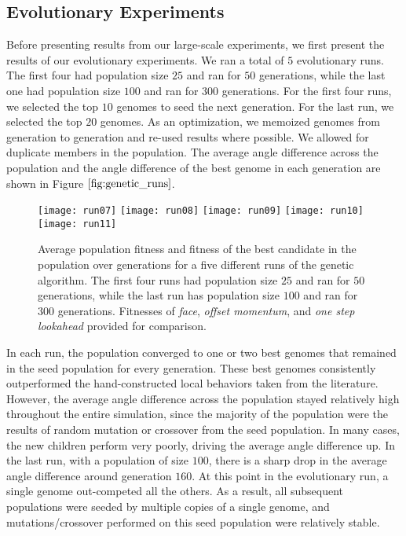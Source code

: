 \subsection{Evolutionary Experiments}
Before presenting results from our large-scale experiments, we first present
the results of our evolutionary experiments.
We ran a total of $5$ evolutionary runs.
The first four had population size $25$ and ran for $50$ generations, while the
last one had population size $100$ and ran for $300$ generations.
For the first four runs, we selected the top $10$ genomes to seed the next
generation.
For the last run, we selected the top $20$ genomes.
As an optimization, we memoized genomes from generation to generation and re-used
results where possible.
We allowed for duplicate members in the population.
The average angle difference across the population and the angle difference of the
best genome in each generation are shown in Figure $\ref{fig:genetic_runs}$.
\begin{figure}
    \centering
    \texttt{[image: run07]}
    \texttt{[image: run08]}
    \texttt{[image: run09]}
    \texttt{[image: run10]}
    \texttt{[image: run11]}
    \caption{Average population fitness and fitness of the best candidate in the
    population over generations for a five different runs of the genetic algorithm.
    The first four runs had population size $25$ and ran for $50$ generations,
    while the last run has population size $100$ and ran for $300$ generations.
    Fitnesses of \textit{face}, \textit{offset momentum}, and \textit{one step
    lookahead} provided for comparison.}
    \label{fig:genetic_runs}
\end{figure}

In each run, the population converged to one or two best genomes that remained
in the seed population for every generation.
These best genomes consistently outperformed the hand-constructed local behaviors
taken from the literature.
However, the average angle difference across the population stayed relatively
high throughout the entire simulation, since the majority of the population
were the results of random mutation or crossover from the seed population.
In many cases, the new children perform very poorly, driving the average angle
difference up.
In the last run, with a population of size $100$, there is a sharp drop in the
average angle difference around generation $160$.
At this point in the evolutionary run, a single genome out-competed all the
others.
As a result, all subsequent populations were seeded by multiple copies of a
single genome, and mutations/crossover performed on this seed population
were relatively stable.

